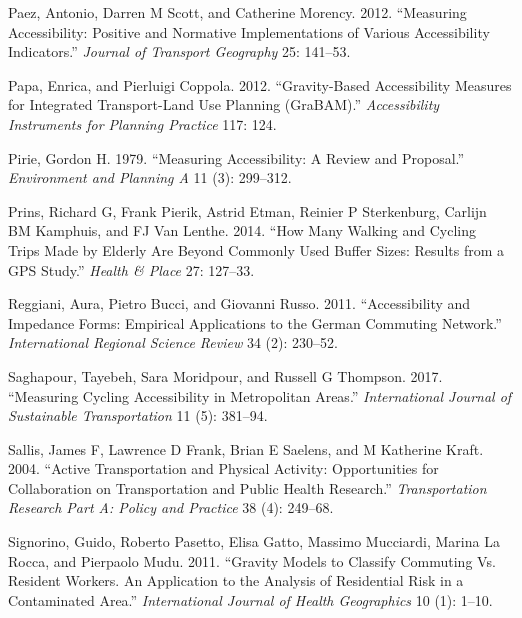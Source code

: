\documentclass[preprint, 3p,
authoryear]{elsarticle} %
\newlength{\cslhangindent}
\newlength{\cslentryspacingunit} %
\newenvironment{CSLReferences}[2] %
 {%
  \setlength{\parindent}{0pt}
  \ifodd #1
  \let\oldpar\par
  \def\par{\hangindent=\cslhangindent\oldpar}
  \fi
  \setlength{\parskip}{#2\cslentryspacingunit}
 }%
 {}
\begin{document}
\begin{CSLReferences}{1}{0}
\leavevmode{}%
Paez, Antonio, Darren M Scott, and Catherine Morency. 2012. {``Measuring
Accessibility: Positive and Normative Implementations of Various
Accessibility Indicators.''} \emph{Journal of Transport Geography} 25:
141--53.

\leavevmode{}%
Papa, Enrica, and Pierluigi Coppola. 2012. {``Gravity-Based
Accessibility Measures for Integrated Transport-Land Use Planning
(GraBAM).''} \emph{Accessibility Instruments for Planning Practice} 117:
124.

\leavevmode{}%
Pirie, Gordon H. 1979. {``Measuring Accessibility: A Review and
Proposal.''} \emph{Environment and Planning A} 11 (3): 299--312.

\leavevmode{}%
Prins, Richard G, Frank Pierik, Astrid Etman, Reinier P Sterkenburg,
Carlijn BM Kamphuis, and FJ Van Lenthe. 2014. {``How Many Walking and
Cycling Trips Made by Elderly Are Beyond Commonly Used Buffer Sizes:
Results from a GPS Study.''} \emph{Health \& Place} 27: 127--33.

\leavevmode{}%
Reggiani, Aura, Pietro Bucci, and Giovanni Russo. 2011. {``Accessibility
and Impedance Forms: Empirical Applications to the German Commuting
Network.''} \emph{International Regional Science Review} 34 (2):
230--52.

\leavevmode{}%
Saghapour, Tayebeh, Sara Moridpour, and Russell G Thompson. 2017.
{``Measuring Cycling Accessibility in Metropolitan Areas.''}
\emph{International Journal of Sustainable Transportation} 11 (5):
381--94.

\leavevmode{}%
Sallis, James F, Lawrence D Frank, Brian E Saelens, and M Katherine
Kraft. 2004. {``Active Transportation and Physical Activity:
Opportunities for Collaboration on Transportation and Public Health
Research.''} \emph{Transportation Research Part A: Policy and Practice}
38 (4): 249--68.

\leavevmode{}%
Signorino, Guido, Roberto Pasetto, Elisa Gatto, Massimo Mucciardi,
Marina La Rocca, and Pierpaolo Mudu. 2011. {``Gravity Models to Classify
Commuting Vs. Resident Workers. An Application to the Analysis of
Residential Risk in a Contaminated Area.''} \emph{International Journal
of Health Geographics} 10 (1): 1--10.


\end{CSLReferences}
\end{document}
